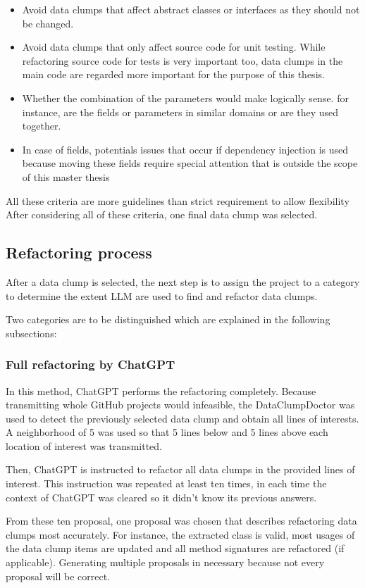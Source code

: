 \begin{itemize}
    \item Avoid data clumps that affect abstract classes or interfaces as they should not be changed.
    \item Avoid data clumps that only affect source code for unit testing. While refactoring source code for tests is very important too, data clumps in the main code are regarded more important for the purpose of this thesis.
    \item Whether the combination of the parameters would make logically sense. for instance, are the fields or parameters in similar domains or are they used together. 
    \item In case of fields, potentials issues that occur if dependency injection is used because moving these fields require special attention that is outside the scope of this master thesis
\end{itemize}
All these criteria are more guidelines than strict requirement to allow flexibility 
After considering all of these criteria, one final data clump was selected.
\subsection{Refactoring process}

After a data clump is selected, the next step is to assign the project to a category to determine the extent \acs{LLM} are used to find and refactor data clumps. 

Two categories are to be distinguished which are explained in the following subsections:

\subsubsection{Full refactoring by ChatGPT}
In this method, ChatGPT performs the refactoring completely. Because transmitting whole GitHub projects would infeasible, the DataClumpDoctor was used to detect the previously selected data clump and obtain all lines of interests. A neighborhood of 5 was used so that 5 lines below and 5 lines above each location of interest was transmitted. 

Then, ChatGPT is instructed to refactor all data clumps in the provided lines of interest. This instruction was repeated at least ten times, in each time the context of ChatGPT was cleared so it didn't know its previous answers. 

From these ten proposal, one proposal was chosen that describes refactoring data clumps most accurately. For instance, the extracted class is valid, most usages of the data clump items are updated and all method signatures are refactored (if applicable). Generating multiple proposals in necessary because not every proposal will be correct.

